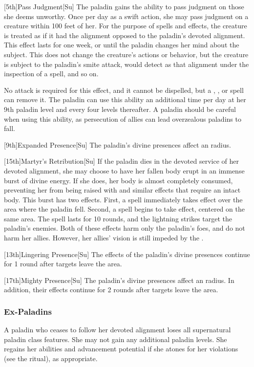[5th]{Pass Judgment}[Su]
The paladin gains the ability to pass judgment on those she deems unworthy.
Once per day as a swift action, she may pass judgment on a creature within 100 feet of her.
For the purpose of spells and effects, the creature is treated as if it had the alignment opposed to the paladin's devoted alignment.
This effect lasts for one week, or until the paladin changes her mind about the subject.
This does not change the creature's actions or behavior, but the creature is subject to the paladin's smite attack, would detect as that alignment under the inspection of a  spell, and so on.

No attack is required for this effect, and it cannot be dispelled, but a , , or  spell can remove it.
The paladin can use this ability an additional time per day at her 9th paladin level and every four levels thereafter.
A paladin should be careful when using this ability, as persecution of allies can lead overzealous paladins to fall.

[9th]{Expanded Presence}[Su]
The paladin's divine presences affect an \arealarge radius.

[15th]{Martyr's Retribution}[Su]
If the paladin dies in the devoted service of her devoted alignment, she may choose to have her fallen body erupt in an immense burst of divine energy.
If she does, her body is almost completely consumed, preventing her from being raised with  and similar effects that require an intact body.
This burst has two effects.
First, a  spell immediately takes effect over the area where the paladin fell.
Second, a  spell begins to take effect, centered on the same area.
The spell lasts for 10 rounds, and the lightning strikes target the paladin's enemies.
Both of these effects harm only the paladin's foes, and do not harm her allies.
However, her allies' vision is still impeded by the .

[13th]{Lingering Presence}[Su]
The effects of the paladin's divine presences continue for 1 round after targets leave the area.

[17th]{Mighty Presence}[Su]
The paladin's divine presences affect an \areahuge radius.
In addition, their effects continue for 2 rounds after targets leave the area.

\subsubsection{Ex-Paladins}
A paladin who ceases to follow her devoted alignment loses all supernatural paladin class features.
She may not gain any additional paladin levels.
She regains her abilities and advancement potential if she atones for her violations (see the  ritual), as appropriate.

